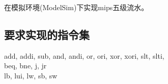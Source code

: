 在模拟环境(ModelSim)下实现mips五级流水。
\subsection{要求实现的指令集}
add, addi, sub, and, andi, or, ori, xor, xori, slt, slti,　\\
beq, bne, j, jr \\
lb, lui, lw, sb, sw 
